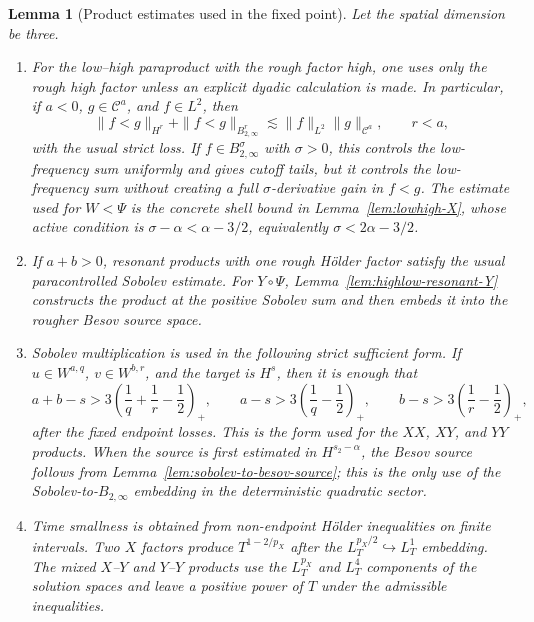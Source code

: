 \documentclass[10pt]{amsart}
\numberwithin{equation}{section}
\theoremstyle{plain}
\newtheorem{lemma}[theorem]{Lemma}
\theoremstyle{definition}
\theoremstyle{remark}
\newcommand{\C}{\mathcal{C}}
\begin{document}
\begin{lemma}[Product estimates used in the fixed point]\label{lem:det-product-toolbox}
Let the spatial dimension be three.
\begin{enumerate}[label=(\roman*),leftmargin=*]
\item For the low--high paraproduct with the rough factor high, one uses only the rough high factor unless an explicit dyadic calculation is made.  In particular, if $a<0$, $g\in\C^a$, and $f\in L^2$, then
\[
        \|f<g\|_{H^r}+\|f<g\|_{B_{2,\infty}^r}
        \lesssim \|f\|_{L^2}\|g\|_{\C^a},
        \qquad r<a,
\]
with the usual strict loss.  If $f\in B_{2,\infty}^\sigma$ with $\sigma>0$, this controls the low-frequency sum uniformly and gives cutoff tails, but it controls the low-frequency sum without creating a full $\sigma$-derivative gain in $f<g$.  The estimate used for $W<\Psi$ is the concrete shell bound in Lemma~\ref{lem:lowhigh-X}, whose active condition is $\sigma-\alpha<\alpha-3/2$, equivalently $\sigma<2\alpha-3/2$.
\item If $a+b>0$, resonant products with one rough H\"older factor satisfy the usual paracontrolled Sobolev estimate.  For $Y\circ\Psi$, Lemma~\ref{lem:highlow-resonant-Y} constructs the product at the positive Sobolev sum and then embeds it into the rougher Besov source space.
\item Sobolev multiplication is used in the following strict sufficient form.  If $u\in W^{a,q}$, $v\in W^{b,r}$, and the target is $H^s$, then it is enough that
\[
        a+b-s>3\left(\frac1q+\frac1r-\frac12\right)_+,
        \qquad
        a-s>3\left(\frac1q-\frac12\right)_+,
        \qquad
        b-s>3\left(\frac1r-\frac12\right)_+,
\]
after the fixed endpoint losses.  This is the form used for the $XX$, $XY$, and $YY$ products.  When the source is first estimated in $H^{s_2-\alpha}$, the Besov source follows from Lemma~\ref{lem:sobolev-to-besov-source}; this is the only use of the Sobolev-to-$B_{2,\infty}$ embedding in the deterministic quadratic sector.
\item Time smallness is obtained from non-endpoint H\"older inequalities on finite intervals.  Two $X$ factors produce $T^{1-2/p_X}$ after the $L_T^{p_X/2}\hookrightarrow L_T^1$ embedding.  The mixed $X$--$Y$ and $Y$--$Y$ products use the $L_T^{p_X}$ and $L_T^4$ components of the solution spaces and leave a positive power of $T$ under the admissible inequalities.
\end{enumerate}
\end{lemma}
\end{document}

